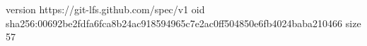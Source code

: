 version https://git-lfs.github.com/spec/v1
oid sha256:00692be2fdfa6fca8b24ac918594965c7e2ac0ff504850e6fb4024baba210466
size 57
